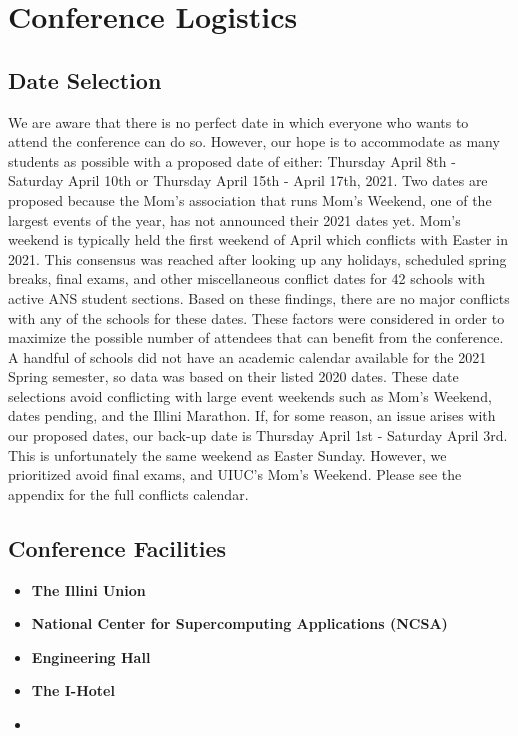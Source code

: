 \documentclass[11pt, letterpaper]{article}
\begin{document}
\newpage
\section{Conference Logistics}

\subsection{Date Selection}
We are aware that there is no perfect date in which everyone who wants to attend the conference can do so. However, our hope is to accommodate as many students as possible with a proposed date of either: Thursday April 8th - Saturday April 10th or Thursday April 15th - April 17th, 2021. Two dates are proposed because the Mom's association that runs Mom's Weekend, one of the largest events of the year, has not announced their 2021 dates yet. Mom's weekend is typically held the first weekend of April which conflicts with Easter in 2021. This consensus was reached after looking up any holidays, scheduled spring breaks, final exams, and other miscellaneous conflict dates for 42 schools with active ANS student sections. Based on these findings, there are no major conflicts with any of the schools for these dates. These factors were considered in order to maximize the possible number of attendees that can benefit from the conference. A handful of schools did not have an academic calendar available for the 2021 Spring semester, so data was based on their listed 2020 dates. These date selections avoid conflicting with large event weekends such as Mom's Weekend, dates pending, and the Illini Marathon. If, for some reason, an issue arises with our proposed dates, our back-up date is Thursday April 1st - Saturday April 3rd. This is unfortunately the same weekend as Easter Sunday. However, we prioritized avoid final exams, and UIUC’s Mom’s Weekend. Please see the appendix for the full conflicts calendar.

\subsection{Conference Facilities}
\begin{itemize}
  \item \textbf{The Illini Union}\\
  \item \textbf{National Center for Supercomputing Applications (NCSA)}\\
  \item \textbf{Engineering Hall}\\
  \item \textbf{The I-Hotel}\\
  \item \textbf{}\\
\end{itemize}
\end{document}
